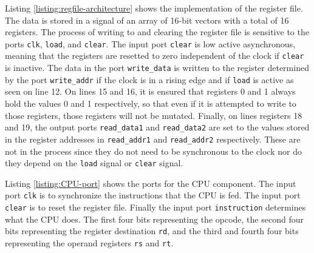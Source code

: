 \documentclass[11pt]{report}
\begin{document}

Listing \ref{listing:regfile-architecture} shows the implementation of the register file. The data
is stored in a signal of an array of 16-bit vectors with a total of 16 registers. The process of
writing to and clearing the register file is sensitive to the ports \verb|clk|, \verb|load|, and
\verb|clear|. The input port \verb|clear| is low active asynchronous, meaning that the registers are
resetted to zero independent of the clock if \verb|clear| is inactive. The data in the port
\verb|write_data| is written to the register determined by the port \verb|write_addr| if the clock
is in a rising edge and if \verb|load| is active as seen on line 12. On lines 15 and 16, it is
ensured that registers 0 and 1 always hold the values 0 and 1 respectively, so that even if it is
attempted to write to those registers, those registers will not be mutated. Finally, on lines
registers 18 and 19, the output ports \verb|read_data1| and \verb|read_data2| are set to the values
stored in the register addresses in \verb|read_addr1| and \verb|read_addr2| respectively. These are
not in the process since they do not need to be synchronous to the clock nor do they depend on the
\verb|load| signal or \verb|clear| signal.

\newpage


Listing \ref{listing:CPU-port} shows the ports for the CPU component. The input port \verb|clk| is
to synchronize the instructions that the CPU is fed. The input port \verb|clear| is to reset the
register file. Finally the input port \verb|instruction| determines what the CPU does. The first
four bits representing the opcode, the second four bits representing the register destination
\verb|rd|, and the third and fourth four bits representing the operand registers \verb|rs| and
\verb|rt|.
\end{document}

